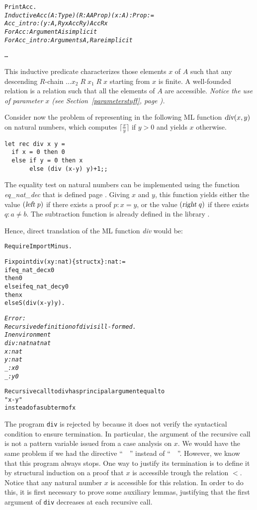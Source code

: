 \documentclass[11pt]{article}
\begin{document}
\begin{alltt}
Print Acc.
\it
Inductive Acc (A : Type) (R : A {\arrow} A {\arrow} Prop) (x:A) : Prop :=
    Acc_intro : ({\prodsym} y : A, R y x {\arrow} Acc R y) {\arrow} Acc R x
For Acc: Argument A is implicit
For Acc_intro: Arguments A, R are implicit

\dots
\end{alltt}

\noindent This inductive predicate characterizes those elements $x$ of
$A$ such that any descending $R$-chain $\ldots x_2\;R\;x_1\;R\;x$
starting from $x$ is finite. A well-founded relation is a relation
such that all the elements of $A$ are accessible.
\emph{Notice the use of parameter $x$ (see Section~\ref{parameterstuff}, page
\pageref{parameterstuff}).}

Consider now the problem of representing in {\coq} the following ML
function $\textsl{div}(x,y)$ on natural numbers, which computes
$\lceil\frac{x}{y}\rceil$ if $y>0$ and yields $x$ otherwise.

\begin{verbatim}
let rec div x y =
  if x = 0 then 0
  else if y = 0 then x
       else (div (x-y) y)+1;;
\end{verbatim}


The equality test on natural numbers can be implemented using the
function \textsl{eq\_nat\_dec} that is defined page \pageref{iseqpage}. Giving $x$ and
$y$, this function yields either the value $(\textsl{left}\;p)$ if
there exists a proof $p:x=y$, or the value $(\textsl{right}\;q)$ if
there exists $q:a\not = b$. The subtraction function is already
defined in the library .

Hence, direct translation of the ML function \textsl{div} would be:

\begin{alltt}
Require Import Minus.

Fixpoint div (x y:nat)\{struct x\}: nat :=
 if eq_nat_dec x 0
  then 0
  else if eq_nat_dec y 0
       then x
       else S (div (x-y) y).

\it Error:
Recursive definition of div is ill-formed.
In environment
div : nat {\arrow} nat {\arrow} nat
x : nat
y : nat
_ : x {\coqdiff} 0
_ : y {\coqdiff} 0

Recursive call to div has principal argument equal to
"x - y"
instead of a subterm of x
\end{alltt}


The program \texttt{div} is rejected by {\coq} because it does not verify
the syntactical condition to ensure termination. In particular, the
argument of the recursive call is not a pattern variable issued from a
case analysis on $x$.
We would have the same problem if we had the directive
``~~'' instead of ``~~''.
However, we know that this program always
stops. One way to justify its termination is to define it by
structural induction on a proof that $x$ is accessible trough the
relation $<$. Notice that any natural number $x$ is accessible
for this relation. In order to do this, it is first necessary to prove
some auxiliary lemmas, justifying that the first argument of
\texttt{div} decreases at each recursive call.
\end{document}
